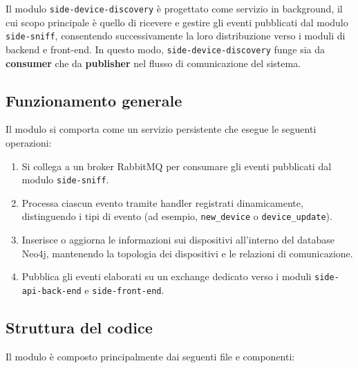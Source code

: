 Il modulo \texttt{side-device-discovery} è progettato come servizio in background, il cui scopo principale è quello di ricevere e gestire gli eventi pubblicati dal modulo \texttt{side-sniff}, consentendo successivamente la loro distribuzione verso i moduli di backend e front-end. In questo modo, \texttt{side-device-discovery} funge sia da \textbf{consumer} che da \textbf{publisher} nel flusso di comunicazione del sistema.

\subsection{Funzionamento generale}

Il modulo si comporta come un servizio persistente che esegue le seguenti operazioni:
\begin{enumerate}
    \item Si collega a un broker RabbitMQ per consumare gli eventi pubblicati dal modulo \texttt{side-sniff}.
    \item Processa ciascun evento tramite handler registrati dinamicamente, distinguendo i tipi di evento (ad esempio, \texttt{new\_device} o \texttt{device\_update}).
    \item Inserisce o aggiorna le informazioni sui dispositivi all'interno del database Neo4j, mantenendo la topologia dei dispositivi e le relazioni di comunicazione.
    \item Pubblica gli eventi elaborati su un exchange dedicato verso i moduli \texttt{side-api-back-end} e \texttt{side-front-end}.
\end{enumerate}

\subsection{Struttura del codice}

Il modulo è composto principalmente dai seguenti file e componenti:

